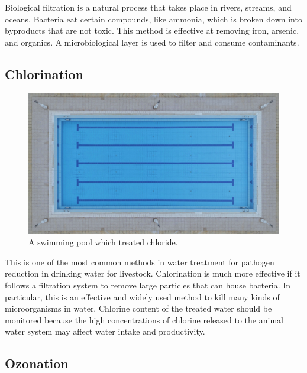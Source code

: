 \documentclass[]{book}
\begin{document}
Biological filtration is a natural process that takes place in rivers, streams, and oceans. Bacteria eat certain compounds, like ammonia, which is broken down into byproducts that are not toxic. This method is effective at removing iron, arsenic, and organics. A microbiological layer is used to filter and consume contaminants.

\hypertarget{chlorination}{%
\subsection{Chlorination}\label{chlorination}}

\begin{figure}

{\centering \includegraphics[width=1\linewidth]{figures/swimming-pool} 

}

\caption{A swimming pool which treated chloride.}\label{fig:swimming-pool}
\end{figure}

This is one of the most common methods in water treatment for pathogen reduction in drinking water for livestock. Chlorination is much more effective if it follows a filtration system to remove large particles that can house bacteria. In particular, this is an effective and widely used method to kill many kinds of microorganisms in water. Chlorine content of the treated water should be monitored because the high concentrations of chlorine released to the animal water system may affect water intake and productivity.

\hypertarget{ozonation}{%
\subsection{Ozonation}\label{ozonation}}
\end{document}
